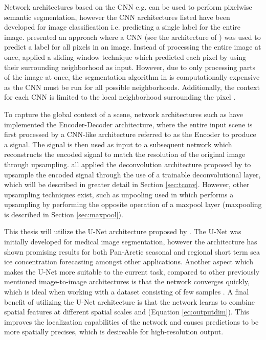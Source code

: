 \documentclass[../main/thesis.tex]{subfiles}
\begin{document}
Network architectures based on the CNN e.g. \citep{LeCun1989,Ciresan2012,Krizhevsky2012,Simonyan2014,Szegedy2014,He2015a,Huang2016} can be used to perform pixelwise semantic segmentation, however the CNN architectures listed have been developed for image classification i.e. predicting a single label for the entire image. \citet{Ciresan2012a} presented an approach where a CNN (see the architecture of \citet{Ciresan2012}) was used to predict a label for all pixels in an image. Instead of processing the entire image at once, \citet{Ciresan2012a} applied a sliding window technique which predicted each pixel by using their surrounding neighborhood as input. However, due to only processing parts of the image at once, the segmentation algorithm in \citet{Ciresan2012a} is computationally expensive as the CNN must be run for all possible neighborhoods. Additionally, the context for each CNN is limited to the local neighborhood surrounding the pixel \citep{Ronneberger2015}.

To capture the global context of a scene, network architectures such as \citet{Long2015,Noh2015,Ronneberger2015,Badrinarayanan2017,Chen2018} have implemented the Encoder-Decoder architecture, where the entire input scene is first processed by a CNN-like architecture referred to as the Encoder to produce a signal. The signal is then used as input to a subsequent network which reconstructs the encoded signal to match the resolution of the original image through upsampling. \citet{Long2015,Ronneberger2015,Badrinarayanan2017} all applied the deconvolution architecture proposed by \citet{Zeiler2010} to upsample the encoded signal through the use of a trainable deconvolutional layer, which will be described in greater detail in Section \ref{sec:tconv}. However, other upsampling techniques exist, such as unpooling used in \citet{Noh2015} which performs a upsampling by performing the opposite operation of a maxpool layer (maxpooling is described in Section \ref{sec:maxpool}).

This thesis will utilize the U-Net architecture proposed by \citet{Ronneberger2015}. The U-Net was initially developed for medical image segmentation, however the architecture has shown promising results for both Pan-Arctic seasonal \citep{Andersson2021} and regional short term \citep{Grigoryev2022} sea ice concentration forecasting amongst other applications. Another aspect which makes the U-Net more suitable to the current task, compared to other previously mentioned image-to-image architectures is that the network converges quickly, which is ideal when working with a dataset consisting of few samples \citep{Ronneberger2015}. A final benefit of utilizing the U-Net architecture is that the network learns to combine spatial features at different spatial scales \citep{Ronneberger2015} and (Equation \ref{eq:outputdim}). This improves the localization capabilities of the network and causes predictions to be more spatially precises, which is desireable for high-resolution output.
\end{document}
